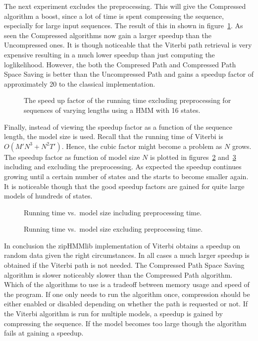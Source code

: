 The next experiment excludes the preprocessing. This will give the Compressed
algorithm a boost, since a lot of time is spent compressing the sequence,
especially for large input sequences. The result of this in shown in
figure~\ref{fig:speedup_vs_sequence_length2}. As seen the Compressed algorithms
now gain a larger speedup than the Uncompressed ones. It is though noticeable
that the Viterbi path retrieval is very expensive resulting in a much lower
speedup than just computing the loglikelihood. However, the both the Compresed
Path and Compressed Path Space Saving is better than the Uncompressed Path and
gains a speedup factor of approximately 20 to the classical implementation.

\begin{figure}
  \centering
  
  \caption{The speed up factor of the running time excluding preprocessing for
    sequences of varying lengths using a HMM with 16 states.}
  \label{fig:speedup_vs_sequence_length2}
\end{figure}

Finally, instead of viewing the speedup factor as a function of the sequence
length, the model size is used. Recall that the running time of Viterbi is
$O(M' N^3 + N^2 T')$. Hence, the cubic factor might become a problem as $N$
grows. The speedup factor as function of model size $N$ is plotted in
figures~\ref{fig:speedup_vs_k} and~\ref{fig:speedup_vs_k2} including and
excluding the preprocessing. As expected the speedup continues growing until a
certain number of states and the starts to become smaller again. It is
noticeable though that the good speedup factors are gained for quite large
models of hundreds of states.

\begin{figure}
  \centering
  
  \caption{Running time vs.\ model size including preprocessing time.}
  \label{fig:speedup_vs_k}
\end{figure}

\begin{figure}
  \centering
  
  \caption{Running time vs.\ model size excluding preprocessing time.}
  \label{fig:speedup_vs_k2}
\end{figure}

In conclusion the zipHMMlib implementation of Viterbi obtains a speedup on
random data given the right circumstances. In all cases a much larger speedup
is obtained if the Viterbi path is not needed. The Compressed Path Space Saving
algorithm is slower noticeably slower than the Compressed Path algorithm. Which
of the algorithms to use is a tradeoff between memory usage and speed of the
program. If one only needs to run the algorithm once, compression should be
either enabled or disabled depending on whether the path is requested or
not. If the Viterbi algorithm is run for multiple models, a speedup is gained
by compressing the sequence. If the model becomes too large though the
algorithm fails at gaining a speedup.

